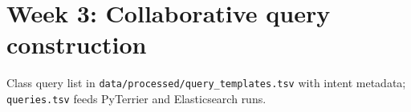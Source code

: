 \section{Week 3: Collaborative query construction}
Class query list in \texttt{data/processed/query\_templates.tsv} with intent metadata; \texttt{queries.tsv} feeds PyTerrier and Elasticsearch runs.
